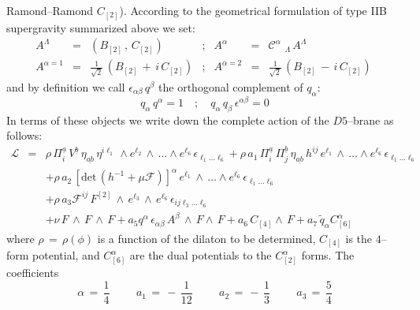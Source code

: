 \documentclass[a4paper,11pt]{article}
\def\tilde{\widetilde}
\begin{document}
Ramond--Ramond $C_{[2]}$). According to the geometrical formulation of type IIB
supergravity summarized above we set:
\begin{equation}
\begin{array}{rclcrcl}
A^{\Lambda} & = & (B_{[2]} \, , \, C_{[2]}) &;&
A^{\alpha} & =& \mathcal{C}^{\alpha} \, \, _{\Lambda} \, A^{\Lambda}
\\
A^{\alpha  = 1} & = & \frac{1}{\sqrt{2}} \, (B_{[2]} \, + \, i \, C_{[2]})
&;&
A^{\alpha  = 2} & = & \frac{1}{\sqrt{2}} \, (B_{[2]} \, - \, i \,
C_{[2]})\
\end{array}
\label{def A}
\end{equation}
and by definition we call $\epsilon_{\alpha\beta} \,q^{\beta}$ the orthogonal complement of $q_\alpha$:
\begin{equation}
  q_\alpha \, q^\alpha =1 \quad ; \quad q_\alpha \, q_\beta \,
  \epsilon^{\alpha\beta}=0
\label{qvecti}
\end{equation}
In terms of these objects we write down the complete action of the $D5$--brane as follows:
\begin{eqnarray}
\mathcal{L} & = & \rho \, \Pi^{\underline{a}} _i \, V^{\underline{b}} \, \eta_{\underline{ab}}
 \, \eta^{i\ell_1} \, \wedge e^{\ell_2} \, \wedge \, \dots \wedge e^{\ell_6} \, \epsilon_{\ell_1 \dots \ell_6}
  + \rho \, a_1 \, \Pi^{\underline{a}} _i \, \Pi^{\underline{b}}
_j \, \eta_{\underline{ab}} \, h^{ij} \, e^{\ell_1} \, \wedge \, \dots
\wedge e^{\ell_6} \, \epsilon_{\ell_1 \dots \ell_6} \nonumber\\
&&+ \rho \, a_2 \, \left [ \mbox{det}\,\left(  h^{-1} + \mu \mathcal{F}\right) \right] ^\alpha \,
  e^{\ell_1} \, \wedge \, \dots
\wedge e^{\ell_6} \, \epsilon_{\ell_1 \dots \ell_6}\nonumber\\
&& + \rho \, a_3 \mathcal{F}^{ij} \, F^{[2]} \, \wedge \, e^{\ell_3} \, \wedge \,e^{\ell_6} \,
\epsilon_{ij\ell_3 \dots \ell_6} \nonumber \\
&&+\nu \, F \, \wedge \, F \, \wedge \, F + a_5 q^{\alpha} \, \epsilon_{\alpha \beta} \, A^{\beta} \,
\wedge \, F \wedge \, F + a_6 \, C_{[4]} \wedge \, F + a_7 \, \tilde{q}_{\alpha} C_{[6]}^{\alpha}
\label{us eq}
\end{eqnarray}
where $\rho \, = \, \rho(\phi)$ is a function of the dilaton to be determined,
$C_{[4]}$ is the $4$--form potential, and $C_{[6]}^{\alpha}$ are the dual potentials to
the $C_{[2]}^{\alpha}$ forms. The coefficients
\begin{equation}
\alpha\, = \, \frac{1}{4} \hspace{1cm} a_1 \, = \, - \, \frac{1}{12}  \hspace{1cm} a_2 \, = \, - \,
\frac{1}{3} \hspace{1cm}
  a_3\, = \, \frac{5}{4}
\label{repetita}
\end{equation}
\end{document}
